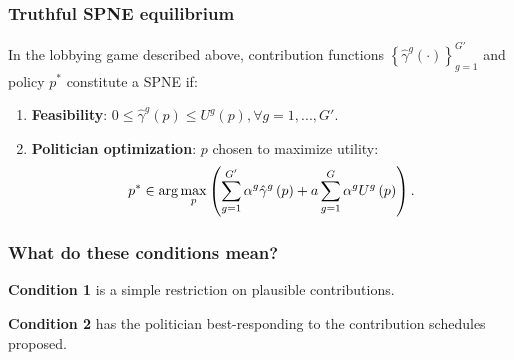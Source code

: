 \documentclass[11pt,aspectratio=169]{beamer}
\begin{document}
\begin{frame}

\frametitle{Truthful SPNE equilibrium}

\begin{theorem} 
\label{chapter institutions lobbying theorem} In the lobbying game described above, contribution functions $\left\{ \hat{\gamma}^{g}\left( \cdot \right) \right\} _{g=1}^{G'}$ and policy $p^*$ constitute a SPNE if: 
\vspace{1em}
\begin{enumerate} 
\item \textbf{Feasibility}: $0\leq \hat{\gamma}^{g}\left( p\right) \leq U^{g}\left( p\right), \forall g=1,...,G'$.
\item \textbf{Politician optimization}: $p$ chosen to maximize utility: $$ \vspace{-10pt} p^*\in \arg \max_{p}\left( \sum_{g=1}^{G^{\prime }}\alpha ^{g}\hat{\gamma}^{g}\left( p\right) +a\sum_{g=1}^{G}\alpha ^{g}U^{g}\left( p\right) \right).$$
\end{enumerate}
\end{theorem}

\end{frame}

\begin{frame}

\frametitle{What do these conditions mean?}

\textbf{Condition 1} is a simple restriction on plausible contributions. 

\pause

\textbf{Condition 2} has the politician best-responding to the contribution schedules proposed. 







\end{frame}
\end{document}
